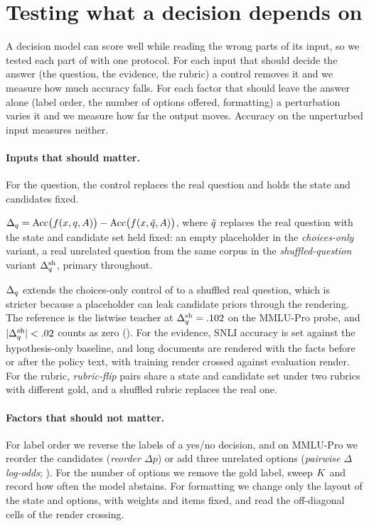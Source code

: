 \section{Testing what a decision depends on}
\label{sec:tests}
\label{sec:setup}

A decision model can score well while reading the wrong parts of its input, so we tested each part of
 with one protocol. For each input that should decide the answer (the question, the
evidence, the rubric) a control removes it and we measure how much accuracy falls. For each factor that
should leave the answer alone (label order, the number of options offered, formatting) a perturbation
varies it and we measure how far the output moves. Accuracy on the unperturbed input measures neither.

\paragraph{Inputs that should matter.}
\label{sec:setup:deltaq}
For the question, the control replaces the real question and holds the state and candidates fixed.

\begin{definition}
\label{def:deltaq}
$\Delta_q = \mathrm{Acc}\big(f(x, q, A)\big) - \mathrm{Acc}\big(f(x, \tilde{q},
A)\big)$, where $\tilde{q}$ replaces the real question with the state and candidate set held
fixed: an empty placeholder in the \emph{choices-only} variant, a real unrelated question from the same
corpus in the \emph{shuffled-question} variant $\Delta_q^{\mathrm{sh}}$, primary throughout.
\end{definition}

$\Delta_q$ extends the choices-only control of \citet{balepur2024artifacts} to a shuffled real question, which
is stricter because a placeholder can leak candidate priors through the rendering. The reference is the
listwise teacher at $\Delta_q^{\mathrm{sh}} = .102$ on the MMLU-Pro probe, and $|\Delta_q^{\mathrm{sh}}| < .02$ counts as zero
(). For the evidence, SNLI accuracy is set against the hypothesis-only baseline, and
long documents are rendered with the facts before or after the policy text, with training render
crossed against evaluation render. For the rubric, \emph{rubric-flip} pairs share a state and candidate
set under two rubrics with different gold, and a shuffled rubric replaces the real one.

\paragraph{Factors that should not matter.}
For label order we reverse the labels of a yes/no decision, and on MMLU-Pro we reorder the candidates
(\emph{reorder $\Delta p$}) or add three unrelated options (\emph{pairwise $\Delta$log-odds};
). For the number of options we remove the gold label, sweep $K$ and record how often the model abstains. For
formatting we change only the layout of the state and options, with weights and items fixed, and read the off-diagonal cells of the
render crossing.

